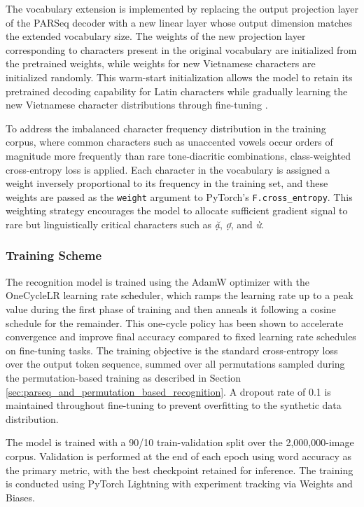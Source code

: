 The vocabulary extension is implemented by replacing the output projection layer of the PARSeq decoder with a new linear layer whose output dimension matches the extended vocabulary size. The weights of the new projection layer corresponding to characters present in the original vocabulary are initialized from the pretrained weights, while weights for new Vietnamese characters are initialized randomly. This warm-start initialization allows the model to retain its pretrained decoding capability for Latin characters while gradually learning the new Vietnamese character distributions through fine-tuning \cite{Bautista2022}.

To address the imbalanced character frequency distribution in the training corpus, where common characters such as unaccented vowels occur orders of magnitude more frequently than rare tone-diacritic combinations, class-weighted cross-entropy loss is applied. Each character in the vocabulary is assigned a weight inversely proportional to its frequency in the training set, and these weights are passed as the \texttt{weight} argument to PyTorch's \texttt{F.cross\_entropy}. This weighting strategy encourages the model to allocate sufficient gradient signal to rare but linguistically critical characters such as \textit{ặ}, \textit{ợ}, and \textit{ừ}.

\subsubsection{Training Scheme}
The recognition model is trained using the AdamW optimizer with the OneCycleLR learning rate scheduler, which ramps the learning rate up to a peak value during the first phase of training and then anneals it following a cosine schedule for the remainder. This one-cycle policy has been shown to accelerate convergence and improve final accuracy compared to fixed learning rate schedules on fine-tuning tasks. The training objective is the standard cross-entropy loss over the output token sequence, summed over all permutations sampled during the permutation-based training as described in Section \ref{sec:parseq_and_permutation_based_recognition}. A dropout rate of 0.1 is maintained throughout fine-tuning to prevent overfitting to the synthetic data distribution.

The model is trained with a 90/10 train-validation split over the 2,000,000-image corpus. Validation is performed at the end of each epoch using word accuracy as the primary metric, with the best checkpoint retained for inference. The training is conducted using PyTorch Lightning with experiment tracking via Weights and Biases.

